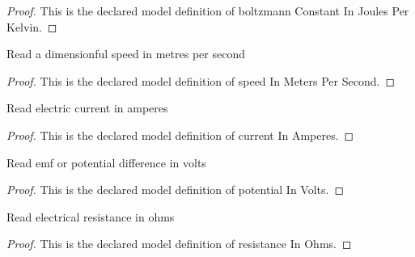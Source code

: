 \begin{proof}
  This is the declared model definition of boltzmann Constant In Joules Per Kelvin.
\end{proof}
\begin{definition}
  \label{def:physics:phyx-mini-0614:phyxminiproblems-problemphyxmini0614-speedinmeterspersecond}
  Read a dimensionful speed in metres per second
\end{definition}
\begin{proof}
  This is the declared model definition of speed In Meters Per Second.
\end{proof}
\begin{definition}
  \label{def:physics:phyx-mini-0614:phyxminiproblems-problemphyxmini0614-currentinamperes}
  Read electric current in amperes
\end{definition}
\begin{proof}
  This is the declared model definition of current In Amperes.
\end{proof}
\begin{definition}
  \label{def:physics:phyx-mini-0614:phyxminiproblems-problemphyxmini0614-potentialinvolts}
  Read emf or potential difference in volts
\end{definition}
\begin{proof}
  This is the declared model definition of potential In Volts.
\end{proof}
\begin{definition}
  \label{def:physics:phyx-mini-0614:phyxminiproblems-problemphyxmini0614-resistanceinohms}
  Read electrical resistance in ohms
\end{definition}
\begin{proof}
  This is the declared model definition of resistance In Ohms.
\end{proof}
